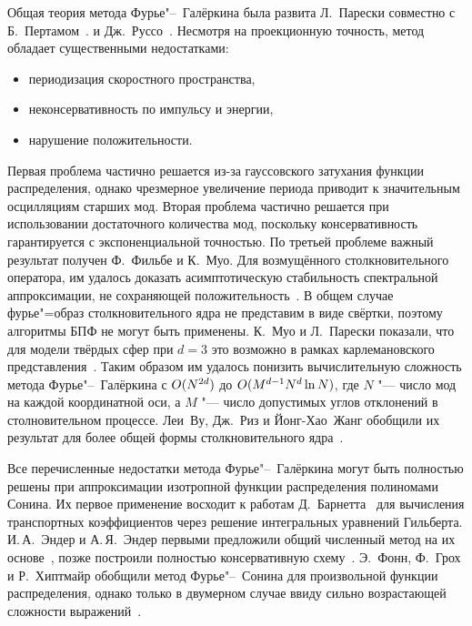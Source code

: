 Общая теория метода Фурье"--~Галёркина была развита Л.~Парески совместно с Б.~Пертамом~\cite{Pareschi1996}.
и Дж.~Руссо~\cite{Pareschi2000method, Pareschi2000stability}.
Несмотря на проекционную точность, метод обладает существенными недостатками:
\begin{itemize}
    \item периодизация скоростного пространства,
    \item неконсервативность по импульсу и энергии,
    \item нарушение положительности.
\end{itemize}
Первая проблема частично решается из-за гауссовского затухания функции распределения,
однако чрезмерное увеличение периода приводит к значительным осцилляциям старших мод.
Вторая проблема частично решается при использовании достаточного количества мод,
поскольку консервативность гарантируется с экспоненциальной точностью.
По третьей проблеме важный результат получен Ф.~Фильбе и К.~Муо.
Для возмущённого столкновительного оператора, им удалось доказать асимптотическую стабильность
спектральной аппроксимации, не сохраняющей положительность~\cite{Filbet2011}.
В общем случае фурье"=образ столкновительного ядра не представим в виде свёртки,
поэтому алгоритмы БПФ не могут быть применены.
К.~Муо и Л.~Парески показали, что для модели твёрдых сфер при \(d=3\) это возможно
в рамках карлемановского представления~\cite{Pareschi2006}.
Таким образом им удалось понизить вычислительную сложность метода Фурье"--~Галёркина
с \(O(N^{2d})\) до \(O(M^{d-1}N^d\ln{N})\), где \(N\) "--- число мод на каждой координатной оси,
а \(M\) "--- число допустимых углов отклонений в столновительном процессе.
Леи~Ву, Дж.~Риз и Йонг-Хао~Жанг обобщили их результат для более общей формы столкновительного ядра~\cite{Wu2014}.

Все перечисленные недостатки метода Фурье"--~Галёркина могут быть полностью решены
при аппроксимации изотропной функции распределения полиномами Сонина.
Их первое применение восходит к работам Д.~Барнетта~\cite{Burnett1935}
для вычисления транспортных коэффициентов через решение интегральных уравнений Гильберта.
И.\,А.~Эндер и А.\,Я.~Эндер первыми предложили общий численный метод на их основе~\cite{Ender1970},
позже построили полностью консервативную схему~\cite{Ender1988}.
Э.~Фонн, Ф.~Грох и Р.~Хиптмайр обобщили метод Фурье"--~Сонина для произвольной функции распределения,
однако только в двумерном случае ввиду сильно возрастающей сложности выражений~\cite{Fonn2014}.

